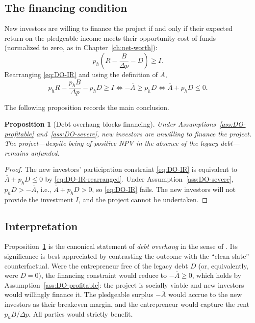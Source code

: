 \documentclass[11pt,a4paper,oneside]{book}
\def\leq{\leqslant}
\def\geq{\geqslant}
\theoremstyle{plain}
\newtheorem{proposition}[theorem]{Proposition}
\theoremstyle{definition}
\theoremstyle{remark}
\numberwithin{equation}{chapter}
\begin{document}
\subsection{The financing condition}

New investors are willing to finance the project if and only if their expected return on the pledgeable income meets their opportunity cost of funds (normalized to zero, as in Chapter~\ref{ch:net-worth}):
\begin{equation}\label{eq:DO-IR}
  p_h \left( R - \frac{B}{\Delta p} - D \right) \geq I.
\end{equation}
Rearranging \eqref{eq:DO-IR} and using the definition of $\overline{A}$,
\begin{equation}\label{eq:DO-IR-rearranged}
  p_h R - \frac{p_h B}{\Delta p} - p_h D \geq I
  \Longleftrightarrow
  - \overline{A} \geq p_h D
  \Longleftrightarrow
  \overline{A} + p_h D \leq 0.
\end{equation}

The following proposition records the main conclusion.

\begin{proposition}[Debt overhang blocks financing]\label{prop:DO-main}
Under Assumptions~\ref{ass:DO-profitable} and~\ref{ass:DO-severe}, new investors are unwilling to finance the project.
The project---despite being of positive NPV in the absence of the legacy debt---remains unfunded.
\end{proposition}

\begin{proof}
The new investors' participation constraint \eqref{eq:DO-IR} is equivalent to $\overline{A} + p_h D \leq 0$ by \eqref{eq:DO-IR-rearranged}.
Under Assumption~\ref{ass:DO-severe}, $p_h D > -\overline{A}$, i.e., $\overline{A} + p_h D > 0$, so \eqref{eq:DO-IR} fails.
The new investors will not provide the investment $I$, and the project cannot be undertaken.
\end{proof}

\subsection{Interpretation}

Proposition~\ref{prop:DO-main} is the canonical statement of \emph{debt overhang} in the sense of \citet{Myers1977}.
Its significance is best appreciated by contrasting the outcome with the ``clean-slate'' counterfactual.
Were the entrepreneur free of the legacy debt $D$ (or, equivalently, were $D = 0$), the financing constraint would reduce to $-\overline{A} \geq 0$, which holds by Assumption~\ref{ass:DO-profitable}: the project is socially viable and new investors would willingly finance it.
The pledgeable surplus $-\overline{A}$ would accrue to the new investors as their breakeven margin, and the entrepreneur would capture the rent $p_h B/\Delta p$.
All parties would strictly benefit.
\end{document}
